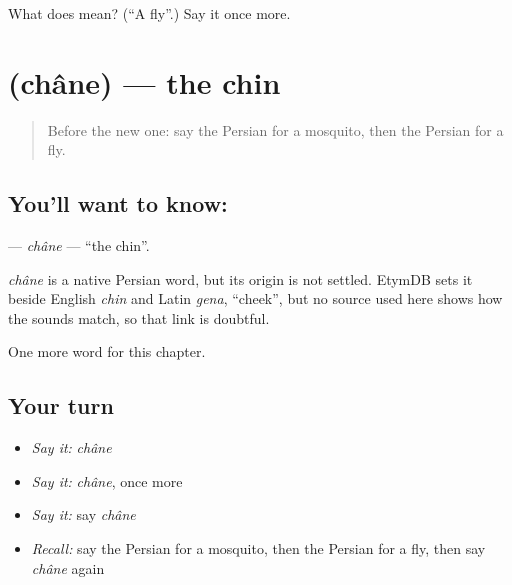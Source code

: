 \begin{tcolorbox}[breakable,colback=teal!4,colframe=teal!35!black,title={Before you move on}]
What does  mean? (\textquotedblleft{}A fly\textquotedblright{}.) Say it once more.
\end{tcolorbox}
\section[\texorpdfstring{\fa{چانه} (châne)}{چانه (châne)}]{ (châne) — the chin}

\label{lesson:FA-C107-chane}



\begin{quote}
Before the new one: say the Persian for a mosquito, then the Persian for a fly.
\end{quote}

\subsection*{You'll want to know: }
\textbf{} — \emph{châne} — \textquotedblleft{}the chin\textquotedblright{}.

\begin{cousinweb}
\emph{châne} is a native Persian word, but its origin is not settled. EtymDB sets it beside English \emph{chin} and Latin \emph{gena}, \textquotedblleft{}cheek\textquotedblright{}, but no source used here shows how the sounds match, so that link is doubtful.
\end{cousinweb}

\begin{grammarlens}[title={What you've built}]
One more word for this chapter.
\end{grammarlens}

\subsection*{Your turn}
\begin{itemize}
\raggedright
  \item \emph{Say it:} \emph{châne}
  \item \emph{Say it:} \emph{châne}, once more
  \item \emph{Say it:} say \emph{châne}
  \item \emph{Recall:} say the Persian for a mosquito, then the Persian for a fly, then say \emph{châne} again
\end{itemize}

